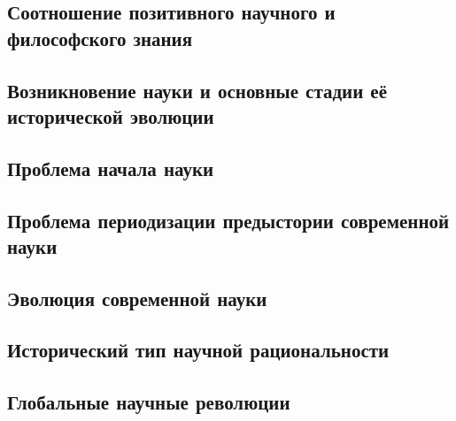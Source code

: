 \documentclass[main.tex]{subfiles}
\begin{document}


\subsection{Соотношение позитивного научного и философского знания}


\subsection{Возникновение науки и основные стадии её исторической эволюции}


\subsection{Проблема начала науки}



\subsection{Проблема периодизации предыстории современной науки}


\subsection{Эволюция современной науки}



\subsection{Исторический тип научной рациональности}



\subsection{Глобальные научные революции}



\end{document}
